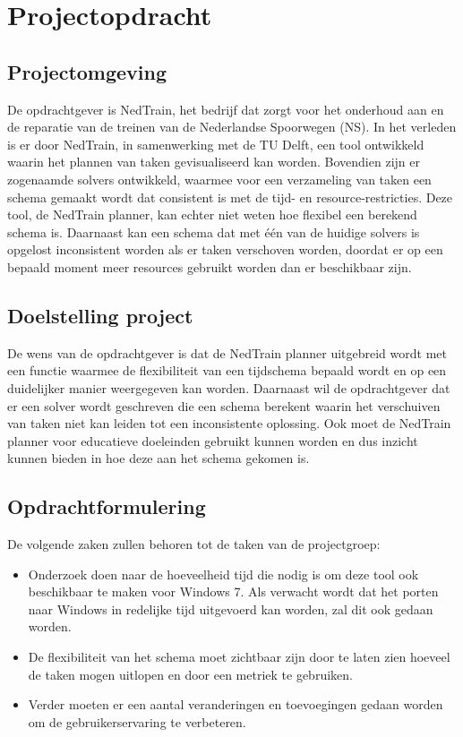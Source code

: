 \section{Projectopdracht}
\subsection{Projectomgeving}
De opdrachtgever is NedTrain, het bedrijf dat zorgt voor het onderhoud aan en de reparatie van de treinen van de Nederlandse Spoorwegen (NS). In het verleden is er door NedTrain, in samenwerking met de TU Delft, een tool ontwikkeld waarin het plannen van taken gevisualiseerd kan worden. Bovendien zijn er zogenaamde solvers ontwikkeld, waarmee voor een verzameling van taken een schema gemaakt wordt dat consistent is met de tijd- en resource-restricties. Deze tool, de NedTrain planner, kan echter niet weten hoe flexibel een berekend schema is. Daarnaast kan een schema dat met \'e\'en van de huidige solvers is opgelost inconsistent worden als er taken verschoven worden, doordat er op een bepaald moment meer resources gebruikt worden dan er beschikbaar zijn.

\subsection{Doelstelling project}
De wens van de opdrachtgever is dat de NedTrain planner uitgebreid wordt met een functie waarmee de flexibiliteit van een tijdschema bepaald wordt en op een duidelijker manier weergegeven kan worden. Daarnaast wil de opdrachtgever dat er een solver wordt geschreven die een schema berekent waarin het verschuiven van taken niet kan leiden tot een inconsistente oplossing. Ook moet de NedTrain planner voor educatieve doeleinden gebruikt kunnen worden en dus inzicht kunnen bieden in hoe deze aan het schema gekomen is.

\subsection{Opdrachtformulering}
De volgende zaken zullen behoren tot de taken van de projectgroep:
\begin{itemize}
	\item Onderzoek doen naar de hoeveelheid tijd die nodig is om deze tool ook beschikbaar te maken voor Windows 7. Als verwacht wordt dat het porten naar Windows in redelijke tijd uitgevoerd kan worden, zal dit ook gedaan worden. 
	\item De flexibiliteit van het schema moet zichtbaar zijn door te laten zien hoeveel de taken mogen uitlopen en door een metriek te gebruiken.
	\item Verder moeten er een aantal veranderingen en toevoegingen gedaan worden om de gebruikerservaring te verbeteren. 
\end{itemize}

